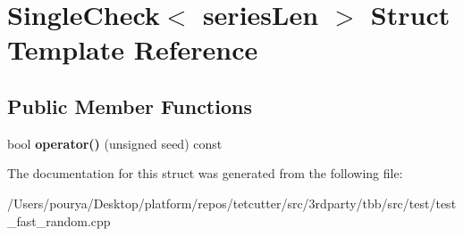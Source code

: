 \hypertarget{structSingleCheck}{}\section{Single\+Check$<$ series\+Len $>$ Struct Template Reference}
\label{structSingleCheck}
\subsection*{Public Member Functions}
\begin{DoxyCompactItemize}
\item 
\hypertarget{structSingleCheck_a1e03c146aa0feef0c5897696cfee529d}{}bool {\bfseries operator()} (unsigned seed) const \label{structSingleCheck_a1e03c146aa0feef0c5897696cfee529d}

\end{DoxyCompactItemize}


The documentation for this struct was generated from the following file\+:\begin{DoxyCompactItemize}
\item 
/\+Users/pourya/\+Desktop/platform/repos/tetcutter/src/3rdparty/tbb/src/test/test\+\_\+fast\+\_\+random.\+cpp\end{DoxyCompactItemize}
